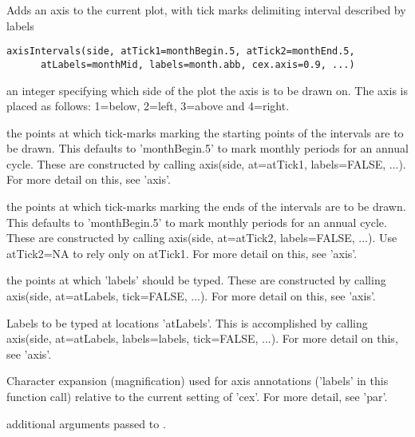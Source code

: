 \documentclass{article}
\begin{document}
\begin{Description}\relax
Adds an axis to the current plot, with tick marks delimiting interval
described by labels
\end{Description}
\begin{Usage}
\begin{verbatim}
axisIntervals(side, atTick1=monthBegin.5, atTick2=monthEnd.5,
      atLabels=monthMid, labels=month.abb, cex.axis=0.9, ...)
\end{verbatim}
\end{Usage}
\begin{Arguments}
\begin{ldescription}
\item[\code{side}] an integer specifying which side of the plot the axis is to
be drawn on.  The axis is placed as follows: 1=below, 2=left,
3=above and 4=right.

\item[\code{atTick1}] the points at which tick-marks marking the starting points of the
intervals are to be drawn.  This defaults to 'monthBegin.5' to mark
monthly periods for an annual cycle.  These are constructed by
calling axis(side, at=atTick1, labels=FALSE, ...).  For more detail
on this, see 'axis'.  

\item[\code{atTick2}] the points at which tick-marks marking the ends of the
intervals are to be drawn.  This defaults to 'monthBegin.5' to mark
monthly periods for an annual cycle.  These are constructed by
calling axis(side, at=atTick2, labels=FALSE, ...).  Use atTick2=NA
to rely only on atTick1.  For more detail
on this, see 'axis'.  

\item[\code{atLabels}] the points at which 'labels' should be typed.  These are constructed
by calling axis(side, at=atLabels, tick=FALSE, ...).  For more detail
on this, see 'axis'.  

\item[\code{labels}] Labels to be typed at locations 'atLabels'.  This is accomplished by
calling axis(side, at=atLabels, labels=labels, tick=FALSE, ...).
For more detail on this, see 'axis'.   

\item[\code{cex.axis}] Character expansion (magnification) used for axis annotations
('labels' in this function call) relative
to the current setting of 'cex'.  For more detail, see 'par'.    

\item[\code{... }] additional arguments passed to 
. 

\end{ldescription}
\end{Arguments}
\end{document}
